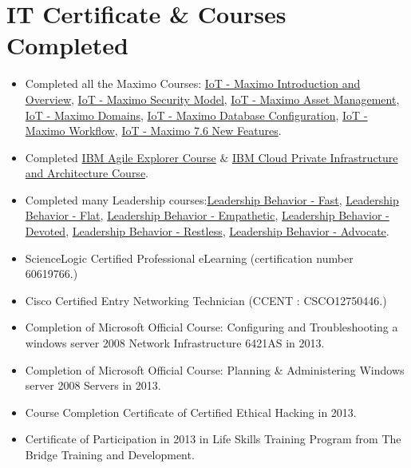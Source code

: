 \documentclass[letterpaper, 12 pt]{article}
\begin{document}
		\section{IT Certificate \& Courses Completed}
			\begin{itemize}[noitemsep]
				\item {Completed all the Maximo Courses: \href{https://www.credly.com/badges/63308385-9f62-46dd-bcf4-7ae85141417f/public_url}{IoT - Maximo Introduction and Overview}, \href{https://www.credly.com/badges/b30f2751-e9e7-48d7-a2b5-05554d597b8a/public_url}{IoT - Maximo Security Model}, \href{https://www.credly.com/badges/83f47a44-e89e-4e09-a9d1-18c5e1962e2a/public_url}{IoT - Maximo Asset Management}, \href{https://www.credly.com/badges/d5e89db9-447e-40d0-b15c-430ecd9a0820/public_url}{IoT - Maximo Domains}, \href{https://www.credly.com/badges/b3788bc2-5080-4e01-a80c-de9fd194956f/public_url}{IoT - Maximo Database Configuration}, \href{https://www.credly.com/badges/cad42cb1-bfc4-41da-9f38-25278f68f5a7/public_url}{IoT - Maximo Workflow}, \href{https://www.credly.com/badges/7a6d6602-a0ae-4cd7-8e84-f5982149b181/public_url}{IoT - Maximo 7.6 New Features}.} 
				\item {Completed \href{https://www.credly.com/badges/94135bf2-5cd9-4cfe-b940-723479544e3f/public_url}{IBM Agile Explorer Course} \& \href{https://www.credly.com/badges/0259d635-d864-4236-8872-a44eea7ab29c/public_url}{IBM Cloud Private Infrastructure and Architecture Course}.}  
				\item {Completed many Leadership courses:\href{https://www.credly.com/badges/af521083-272b-4373-bf01-cf65bbf0251d/public_url}{Leadership Behavior - Fast}, \href{https://www.credly.com/badges/e478b3ff-6f6e-4350-89f9-f3822a450df3/public_url}{Leadership Behavior - Flat}, \href{https://www.credly.com/badges/afa9f307-dce4-48c5-9a2b-24dc7831d602/public_url}{Leadership Behavior - Empathetic}, \href{https://www.credly.com/badges/bbac771c-7f96-4bb6-b89a-8a7f89ba070a/public_url}{Leadership Behavior - Devoted}, \href{https://www.credly.com/badges/0eb16b26-7eba-440e-b657-f8e9715af76c/public_url}{Leadership Behavior - Restless}, \href{https://www.credly.com/badges/899c9aed-17a5-4eca-a8b0-1e132c289225/public_url}{Leadership Behavior - Advocate}.}
				\item {ScienceLogic Certified Professional eLearning (certification number 60619766.)} 
				\item {Cisco Certified Entry Networking Technician (CCENT : CSCO12750446.)} 
				\item {Completion of Microsoft Official Course: Configuring and Troubleshooting a windows server 2008 Network Infrastructure 6421AS in 2013.} 
				\item {Completion of Microsoft Official Course: Planning \& Administering Windows server 2008 Servers in 2013.}
				\item {Course Completion Certificate of Certified Ethical Hacking in 2013.}
				\item {Certificate of Participation in 2013 in Life Skills Training Program from The Bridge Training and Development.}
			\end{itemize}
		
\end{document}
